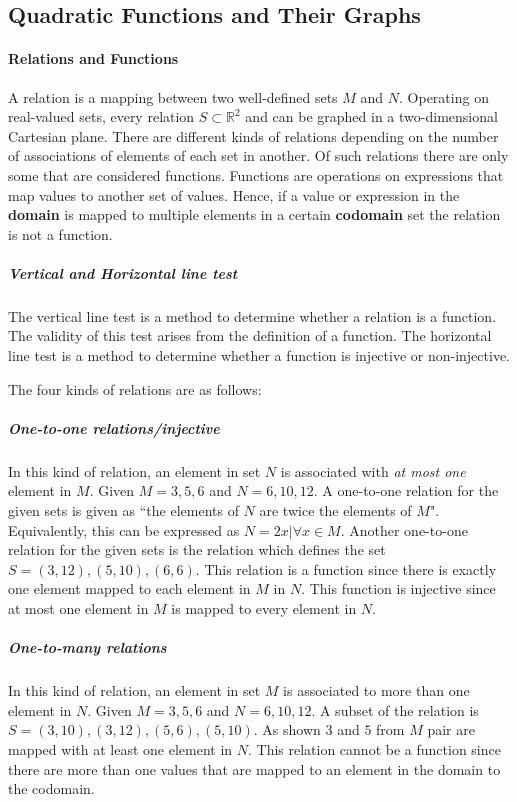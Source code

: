 \subsection{Quadratic Functions and Their Graphs}
\paragraph{Relations and Functions}
A relation is a mapping between two well-defined sets $M$ and $N$.
Operating on real-valued sets, every relation $S \subset \mathbb{R}^2$ and can be graphed in a two-dimensional Cartesian plane.
There are different kinds of relations depending on the number of associations of elements of each set in another.
Of such relations there are only some that are considered functions.
Functions are operations on expressions that map values to another set of values.
Hence, if a value or expression in the \textbf{domain} is mapped to multiple elements in a certain \textbf{codomain} set the relation is not a function.

\subparagraph{Vertical and Horizontal line test}
The vertical line test is a method to determine whether a relation is a function.
The validity of this test arises from the definition of a function.
The horizontal line test is a method to determine whether a function is injective or non-injective.

The four kinds of relations are as follows:

\subparagraph{One-to-one relations/injective}
In this kind of relation, an element in set $N$ is associated with \emph{at most one} element in $M$.
Given $M = {3, 5, 6}$ and $N = {6, 10, 12}$.
A one-to-one relation for the given sets is given as ``the elements of $N$ are twice the elements of $M$".
Equivalently, this can be expressed as $N = {2x | \forall x \in M}$.
Another one-to-one relation for the given sets is the relation which defines the set $S = {(3, 12), (5, 10), (6, 6)}$.
This relation is a function since there is exactly one element mapped to each element in $M$ in $N$.
This function is injective since at most one element in $M$ is mapped to every element in $N$.

\subparagraph{One-to-many relations}
In this kind of relation, an element in set $M$ is associated to more than one element in $N$.
Given $M = {3, 5, 6}$ and $N = {6, 10, 12}$.
A subset of the relation is $S = {(3, 10), (3, 12), (5, 6), (5, 10)}$.
As shown $3$ and $5$ from $M$ pair are mapped with at least one element in $N$.
This relation cannot be a function since there are more than one values that are mapped to an element in the domain to the codomain.

